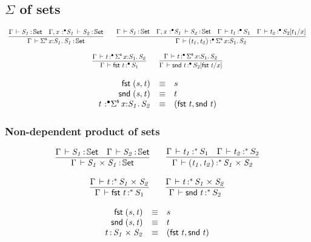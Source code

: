 \documentclass[11pt]{article}
\theoremstyle{plain}
\begin{document}
\subsection{$\Sigma$ of sets}

\[
\begin{array}{c}
\infer{\ofdtp{\Gamma}{\sigmaset{x}{S_1}{S_1}}{\types}}
      {\ofdtp{\Gamma}{S_1}{\types} &
        \ofdtp{\Gamma, \tpvar{x}{\bullet}{{S_1}}}{S_2}{\types}}
\qquad
\infer{\oftpe{\Gamma}{\pair{t_1}{t_2}}{\bullet}{\sigmaset x {S_1} {S_2}}}
      {\ofdtp{\Gamma}{S_1}{\types} &
        \ofdtp{\Gamma, \tpvar{x}{\bullet}{{S_1}}}{S_2}{\types} &
        \oftpe{\Gamma}{t_1}{\bullet}{S_1} &
        \oftpe{\Gamma}{t_2}{\bullet}{\subst{S_2}{t_1}x}}
\\ \\
\infer{\oftpe{\Gamma}{\fst t}{\bullet}{{S_1}}}
      {\oftpe{\Gamma}{t}{\bullet}{\sigmaset{x}{S_1}{S_2}}}
\qquad
\infer{\oftpe{\Gamma}{\snd t}{\bullet}{\subst{S_2}{\fst t}{x}}}
      {\oftpe{\Gamma}{t}{\bullet}{\sigmaset{x}{S_1}{S_2}}}
\end{array}
\]


\[
\begin{array}{rcll}
\mathit{\mathsf{fst}_{} \: \mathit{(s,t)_{}}} & \equiv & s \\
\mathit{\mathsf{snd}_{} \: \mathit{(s,t)_{}}} & \equiv & t \\
\mathit{t} \,^{\,}{:}^{\bullet} \mathit{\textnormal{$\Sigma$}^{\mathsf{s}}\,x \mathit{:} S_1.\,\mathit{S_2}} & \equiv & \mathit{(\mathit{\mathsf{fst}_{} \: t},\mathit{\mathsf{snd}_{} \: t})_{}}
\end{array}
\]

\subsubsection{Non-dependent product of sets}


\[
\begin{array}{c}
\infer{\ofdtp{\Gamma}{\prd{S_1}{S_1}}{\types}}
      {\ofdtp{\Gamma}{S_1}{\types} &
        \ofdtp{\Gamma}{S_2}{\types}}
\qquad
\infer{\oftpe{\Gamma}{\pair{t_1}{t_2}}{\vcond}{\prd {S_1} {S_2}}}
      { \oftpe{\Gamma}{t_1}{\vcond}{S_1} &
        \oftpe{\Gamma}{t_2}{\vcond}{S_2}}
\\ \\
\infer{\oftpe{\Gamma}{\fst t}{\vcond}{{S_1}}}
      {\oftpe{\Gamma}{t}{\vcond}{\prd{S_1}{S_2}}}
\qquad
\infer{\oftpe{\Gamma}{\snd t}{\vcond}{{S_2}}}
      {\oftpe{\Gamma}{t}{\vcond}{\prd{S_1}{S_2}}}
\end{array}
\]

\[
\begin{array}{rcll}
\mathit{\mathsf{fst}_{} \: \mathit{(s,t)_{}}} & \equiv & s \\
\mathit{\mathsf{snd}_{} \: \mathit{(s,t)_{}}} & \equiv & t \\
t \, \mathit{:} \, \mathit{S_1} \times_{\mathit{}} \mathit{S_2} & \equiv & \mathit{(\mathit{\mathsf{fst}_{} \: t},\mathit{\mathsf{snd}_{} \: t})_{}}
\end{array}
\]
\end{document}

